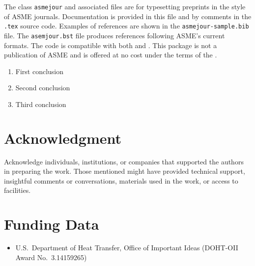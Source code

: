 \documentclass[subscriptcorrection,upint,varvw,barcolor=Goldenrod3,mathalfa=cal=euler,balance,hyphenate,french,pdf-a]{asmejour} %
\begin{document}
The class \texttt{asmejour} and associated files are for typesetting preprints in the style of ASME journals.
Documentation is provided in this file and by comments in the \texttt{.tex} source code. Examples of references are shown in the \texttt{asmejour-sample.bib} file.  The \texttt{asemjour.bst} file produces references following ASME's current formats.  The code is compatible with both {} and \LuaLaTeX. This package is not a publication of ASME and is offered at no cost under the terms of the . 

\begin{enumerate}
\item First conclusion 
\item Second conclusion
\item Third conclusion
\end{enumerate}


\section*{Acknowledgment} %

Acknowledge individuals, institutions, or companies that supported the authors in preparing the work. Those mentioned might have provided technical support, insightful comments or conversations, materials used in the work, or access to facilities.


\section*{Funding Data}

\begin{itemize}
\item U.S.\ Department of Heat Transfer, Office of Important Ideas (DOHT-OII Award No.\ 3.14159265)
\end{itemize}


\end{document}
